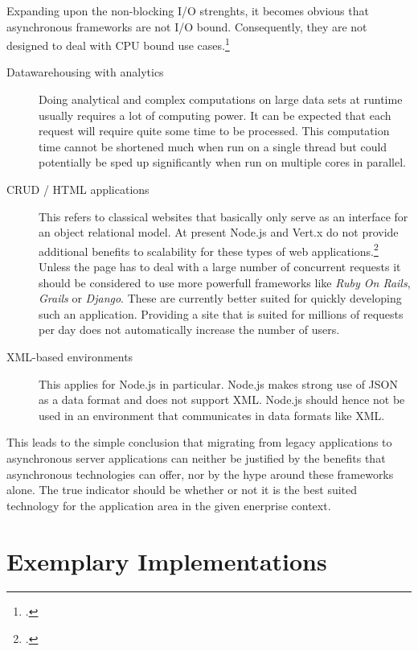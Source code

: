 Expanding upon the non-blocking I/O strenghts, it becomes obvious that
asynchronous frameworks are not I/O bound. Consequently, they are not
designed to deal with CPU bound use cases.\footcite[Cf.][15]{Nguyen_2012}

\begin{description}
  \item[Datawarehousing with analytics] Doing analytical and complex computations
  	on large data sets at runtime usually requires a lot of computing power.
  	It can be expected that each request will require quite some time to be processed.
  	This computation time cannot be shortened much when run on a single thread but 
  	could potentially be sped up significantly when run on multiple cores in parallel. 
  \item[CRUD / HTML applications] 
	This refers to classical websites that basically only serve as an interface for
	an object relational model.
	At present Node.js and Vert.x do not provide additional benefits to scalability
	for these types of web applications.\footcite[Cf.][15]{Roden_2012} Unless the page has to deal with a large number of
	concurrent requests it should be considered to use more powerfull frameworks
	like \textit{Ruby On Rails}, \textit{Grails} or \textit{Django}. These are currently better suited for quickly
	developing such an application. Providing a site that is suited for 
	millions of requests per day does not automatically increase the number of users.
  \item[XML-based environments] This applies for Node.js in particular. Node.js makes strong use of JSON as a data format and
  does not support XML. Node.js should hence not be used in an environment that communicates in data formats like XML.
\end{description}

This leads to the simple conclusion that migrating from legacy applications to asynchronous
server applications can neither be justified by the benefits that asynchronous technologies
can offer, nor by the hype around these frameworks alone. The true indicator should be whether
or not it is the best suited technology for the application area in the given enerprise context.
    


\newpage
\section{Exemplary Implementations}
\label{exemplary_implementations}

